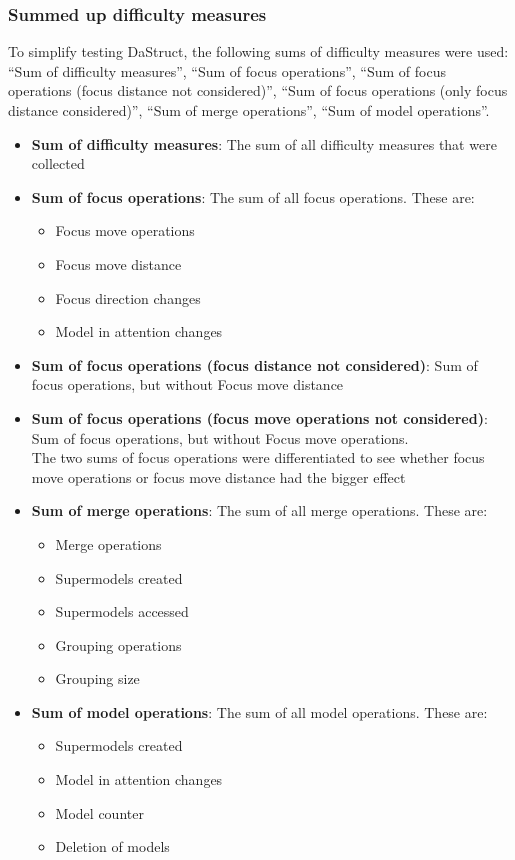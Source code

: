 \documentclass[hidelinks]{scrartcl}
\begin{document}
\subsubsection{Summed up difficulty measures}\label{sec:diff_measures_summed_up}
To simplify testing DaStruct, the following sums of difficulty measures were used:
``Sum of difficulty measures'', ``Sum of focus operations'', ``Sum of focus operations (focus distance not considered)'', ``Sum of focus operations (only focus distance considered)'', ``Sum of merge operations'', ``Sum of model operations''.
\begin{itemize}
	\item \textbf{Sum of difficulty measures}: The sum of all difficulty measures that were collected
	\item \textbf{Sum of focus operations}: The sum of all focus operations. These are:
	\begin{itemize}
		\item Focus move operations
		\item Focus move distance
		\item Focus direction changes
		\item Model in attention changes
	\end{itemize}
	\item \textbf{Sum of focus operations (focus distance not considered)}: Sum of focus operations, but without Focus move distance
	\item \textbf{Sum of focus operations (focus move operations not considered)}: Sum of focus operations, but without Focus move operations. \\
	The two sums of focus operations were differentiated to see whether focus move operations or focus move distance had the bigger effect
	\item \textbf{Sum of merge operations}: The sum of all merge operations. These are:
	\begin{itemize}
		\item Merge operations
		\item Supermodels created
		\item Supermodels accessed
		\item Grouping operations
		\item Grouping size
	\end{itemize}
	\item \textbf{Sum of model operations}: The sum of all model operations. These are:
	\begin{itemize}
		\item Supermodels created
		\item Model in attention changes
		\item Model counter
		\item Deletion of models
	\end{itemize}
\end{itemize}
\end{document}

